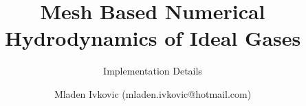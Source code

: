 




\title{Mesh Based Numerical Hydrodynamics of Ideal Gases}
\subtitle{Implementation Details}
\author{Mladen Ivkovic (mladen.ivkovic@hotmail.com)}
\date{}










	



\maketitle
\clearpage




























\printbibliography








